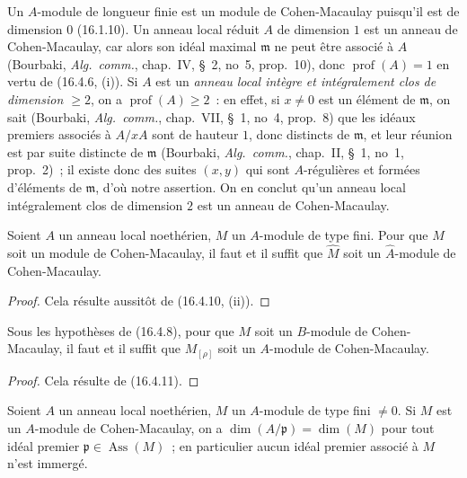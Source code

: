 Un $A$-module de longueur finie est un module de Cohen-Macaulay puisqu'il est
de dimension $0$ (16.1.10). Un anneau local réduit $A$ de dimension $1$ est un
anneau de Cohen-Macaulay, car alors son idéal maximal $\mathfrak{m}$ ne peut
être associé à $A$ (Bourbaki, \emph{Alg.~comm.}, chap.~IV, \S~2, no~5,
prop.~10), donc $\operatorname{prof}(A)=1$ en vertu de (16.4.6, (i)). Si $A$
est un \emph{anneau local intègre et intégralement clos de dimension $\geq2$},
on a $\operatorname{prof}(A)\geq2$~: en effet, si $x\neq0$ est un élément de
$\mathfrak{m}$, on sait (Bourbaki, \emph{Alg.~comm.}, chap.~VII, \S~1, no~4,
prop.~8) que les idéaux premiers associés à $A/xA$ sont de hauteur $1$, donc
distincts de $\mathfrak{m}$, et leur réunion est par suite distincte de
$\mathfrak{m}$ (Bourbaki, \emph{Alg.~comm.}, chap.~II, \S~1, no~1, prop.~2)~;
il existe donc des suites $(x,y)$ qui sont $A$-régulières et formées
d'éléments de $\mathfrak{m}$, d'où notre assertion. On en conclut qu'un anneau
local intégralement clos de dimension $2$ est un anneau de Cohen-Macaulay.

\begin{proposition}[16.5.2]
\label{0.16.5.2-fr}
Soient $A$ un anneau local noethérien, $M$ un $A$-module de type fini. Pour que
$M$ soit un module de Cohen-Macaulay, il faut et il suffit que $\widehat M$
soit un $\widehat A$-module de Cohen-Macaulay.
\end{proposition}

\begin{proof}
Cela résulte aussitôt de (16.4.10, (ii)).
\end{proof}

\begin{proposition}[16.5.3]
\label{0.16.5.3-fr}
Sous les hypothèses de (16.4.8), pour que $M$ soit un $B$-module de
Cohen-Macaulay, il faut et il suffit que $M_{[\rho]}$ soit un $A$-module de
Cohen-Macaulay.
\end{proposition}

\begin{proof}
Cela résulte de (16.4.11).
\end{proof}

\begin{proposition}[16.5.4]
\label{0.16.5.4-fr}
Soient $A$ un anneau local noethérien, $M$ un $A$-module de type fini $\neq0$.
Si $M$ est un $A$-module de Cohen-Macaulay, on a
$\dim(A/\mathfrak{p})=\dim(M)$ pour tout idéal premier
$\mathfrak{p}\in\operatorname{Ass}(M)$~; en particulier aucun idéal premier
associé à $M$ n'est immergé.
\end{proposition}

